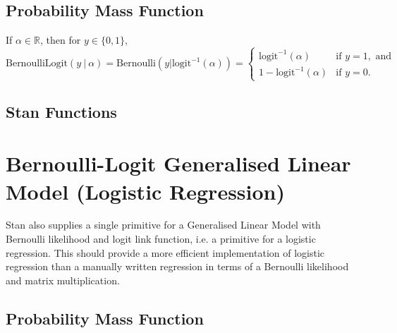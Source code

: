 \begin{description}
{\begin{description}
\subsection{Probability Mass Function}


If $\alpha \in \mathbb{R}$, then for $y \in \{0,1\}$, \[ \text{BernoulliLogit}(y~|~\alpha) = \text{Bernoulli}(y | \text{logit}^{-1}(\alpha)) = \left\{ \begin{array}{ll} \text{logit}^{-1}(\alpha) & \text{if } y = 1, \text{ and} \\ 1 - \text{logit}^{-1}(\alpha) &  \text{if } y = 0. \end{array} \right. \] 



\subsection{Stan Functions}


\begin{description}  \end{description}


\begin{description}    \end{description}


\section{Bernoulli-Logit Generalised Linear Model (Logistic Regression)}\label{bernoulli-logit-glm.section}


Stan also supplies a single primitive for a Generalised Linear Model with Bernoulli likelihood and logit link function, i.e. a primitive for a logistic regression. This should provide a more efficient implementation of logistic regression than a manually written regression in terms of a Bernoulli likelihood and matrix multiplication.


\subsection{Probability Mass Function}



\end{description}}
\end{description}
